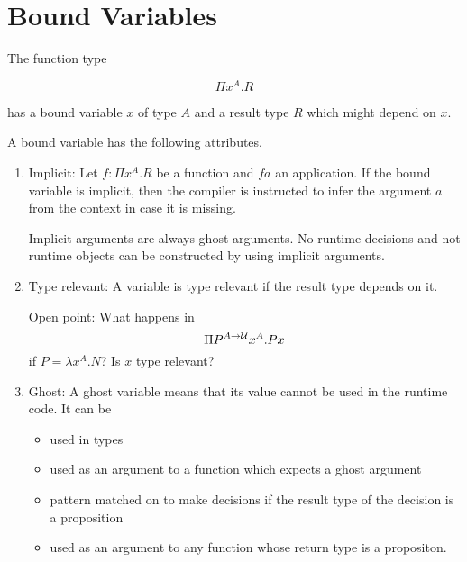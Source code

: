\section{Bound Variables}

The function type

$$
\Pi x^A. R
$$

has a bound variable $x$ of type $A$ and a result type $R$ which might depend on
$x$.

A bound variable has the following attributes.

\begin{enumerate}

    \item Implicit: Let $f: \Pi x^A. R$ be a function and $f a$ an application.
        If the bound variable is implicit, then the compiler is instructed to
        infer the argument $a$ from the context in case it is missing.

        Implicit arguments are always ghost arguments. No runtime decisions and
        not runtime objects can be constructed by using implicit arguments.

    \item Type relevant: A variable is type relevant if the result type depends
        on it.

        Open point: What happens in
        $$
            \Pi P^{A \to {\mathcal U}} x^A. P x
        $$
        if $P = \lambda x^A . N$? Is $x$ type relevant?

    \item Ghost: A ghost variable means that its value cannot be used in the
        runtime code. It can be

        \begin{itemize}
            \item used in types

            \item used as an argument to a function which expects a ghost argument

            \item pattern matched on to make decisions if the result type of the
                decision is a proposition

            \item used as an argument to any function whose return type is a
                propositon.

        \end{itemize}
\end{enumerate}

